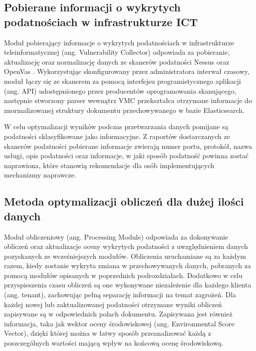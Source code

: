 
\subsection{Pobierane informacji o wykrytych podatnościach w infrastrukturze ICT}
Moduł pobierający informacje o wykrytych podatnościach w infrastrukturze teleinformatycznej (ang. Vulnerability Collector) odpowiada za pobieranie, aktualizację oraz normalizację danych ze skanerów podatności Nessus \cite{beale2004nessus} oraz OpenVas \cite{rahalkar2019openvas}. Wykorzystując skonfigurowany przez administratora interwał czasowy, moduł łączy się ze skanerem za pomocą interfejsu programistycznego aplikacji (ang. API) udostępnionego przez producentów oprogramowania skanującego, następnie stworzony parser wewnątrz VMC przekształca otrzymane informacje do znormalizowanej struktury dokumentu przechowywanego w bazie Elasticsearch.

\bigbreak
W celu optymalizacji wyników podczas przetwarzania danych pomijane są podatności sklasyfikowane jako informacyjne. Z raportów dostarczanych ze skanerów podatności pobierane informacje zwierają numer portu, protokół, nazwa usługi, opis podatności oraz informacje, w jaki sposób podatność powinna zostać naprawiona, które stanowią rekomendacje dla osób implementujących mechanizmy naprawcze.



\subsection{Metoda optymalizacji obliczeń dla dużej ilości danych}
\label{sec:scaling}
Moduł obliczeniowy (ang. Processing Module) odpowiada za dokonywanie obliczeń oraz aktualizacje oceny wykrytych podatności z uwzględnieniem danych pozyskanych ze wcześniejszych modułów. Obliczenia uruchamiane są za każdym razem, kiedy zostanie wykryta zmiana w przechowywanych danych, pobranych za pomocą modułów opisanych w poprzednich podrozdziałach. Dodatkowo w celu przyspieszenia czasu obliczeń są one wykonywane niezależenie dla każdego klienta (ang. tenant), zachowując pełną separację informacji na temat zagrożeń. Dla każdej nowej lub zaktualizowanej podatności otrzymane wyniki obliczeń zapisywane są w odpowiednich polach dokumentu. Zapisywana jest również informacja, taka jak wektor oceny środowiskowej (ang. Environmental Score Vector), dzięki której można w łatwy sposób przeanalizować każdą z poszczególnych wartości mającą wpływ na końcową ocenę środowiskową.

